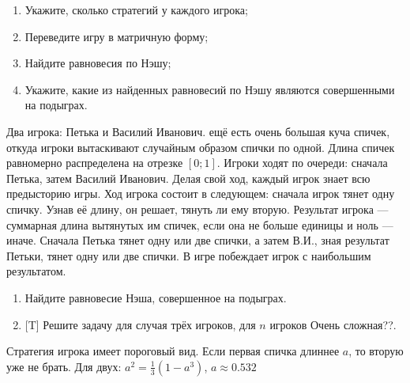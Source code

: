 \begin{problem}
{}
\begin{enumerate}
\item  Укажите, сколько стратегий у каждого игрока;\par
\item Переведите игру в матричную форму;\par
\item Найдите равновесия по Нэшу;\par
\item Укажите, какие из найденных равновесий по Нэшу являются совершенными на подыграх.
\end{enumerate}
\begin{sol}
\end{sol}
\end{problem}





\begin{problem}
Два игрока: Петька и Василий Иванович. ещё есть очень большая куча спичек, откуда игроки вытаскивают случайным образом спички по одной. Длина спичек равномерно распределена на отрезке $[0;1]$. Игроки ходят по очереди: сначала Петька, затем Василий Иванович. Делая свой ход, каждый игрок знает всю предысторию игры. Ход игрока состоит в следующем: сначала игрок тянет одну спичку. Узнав её длину, он решает, тянуть ли ему вторую. Результат игрока --- суммарная длина вытянутых им спичек, если она не больше единицы и ноль --- иначе. Сначала Петька тянет одну или две спички, а затем В.И., зная результат Петьки, тянет одну или две спички. В игре побеждает игрок с наибольшим результатом.
\begin{enumerate}
\item Найдите равновесие Нэша, совершенное на подыграх.
\item $[$T] Решите задачу для случая трёх игроков, для $n$ игроков {\red Очень сложная??}.
\end{enumerate}




\begin{sol}
Стратегия игрока имеет пороговый вид. Если первая спичка длиннее $a$, то вторую уже не брать. Для двух: $a^{2}=\frac{1}{3}(1-a^{3})$, $a\approx 0.532$
\end{sol}
\end{problem}



